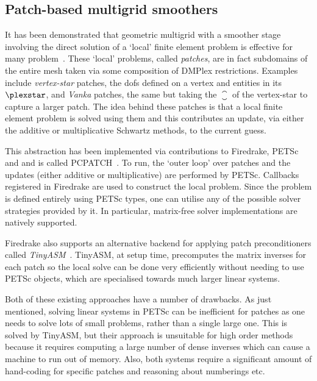 \subsection{Patch-based multigrid smoothers}
\label{sec:future_patch}

It has been demonstrated that geometric multigrid with a smoother stage involving the direct solution of a `local' finite element problem is effective for many problem~\cite{vankaBlockimplicitMultigridSolution1986,arnoldPRECONDITIONINGDivAPPLICATIONS,farrellAugmentedLagrangianPreconditioner2019}.
These `local' problems, called \textit{patches}, are in fact subdomains of the entire mesh taken via some composition of DMPlex restrictions.
Examples include \textit{vertex-star} patches, the \glspl{dof} defined on a vertex and entities in its $\plexstar$, and \textit{Vanka} patches, the same but taking the $\closure$ of the vertex-star to capture a larger patch.
The idea behind these patches is that a local finite element problem is solved using them and this contributes an update, via either the additive or multiplicative Schwartz methods, to the current guess.

This abstraction has been implemented via contributions to Firedrake, PETSc and  and is called PCPATCH~\cite{farrellPCPATCHSoftwareTopological2021}.
To run, the `outer loop' over patches and the updates (either additive or multiplicative) are performed by PETSc.
Callbacks registered in Firedrake are used to construct the local problem.
Since the problem is defined entirely using PETSc types, one can utilise any of the possible solver strategies provided by it.
In particular, matrix-free solver implementations are natively supported.

Firedrake also supports an alternative backend for applying patch preconditioners called \textit{TinyASM}~\cite{wechsungTinyASMBlockJacobiImplementation}.
TinyASM, at setup time, precomputes the matrix inverses for each patch so the local solve can be done very efficiently without needing to use PETSc objects, which are specialised towards much larger linear systems.

Both of these existing approaches have a number of drawbacks.
As just mentioned, solving linear systems in PETSc can be inefficient for patches as one needs to solve lots of small problems, rather than a single large one.
This is solved by TinyASM, but their approach is unsuitable for high order methods because it requires computing a large number of dense inverses which can cause a machine to run out of memory.
Also, both systems require a significant amount of hand-coding for specific patches and reasoning about numberings etc.

